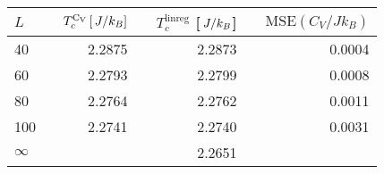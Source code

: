 \begin{tabular}{lrrr}
\toprule
$L$ & $\quad T_c^\mathrm{C_V}\,[\,J/k_B]$ & $\quad T_c^\mathrm{linreg}$ [$\,J/k_B$] & $\quad \mathrm{MSE}(C_V/J k_B)$ \\
\midrule
40 & 2.2875 & 2.2873 & 0.0004 \\
60 & 2.2793 & 2.2799 & 0.0008 \\
80 & 2.2764 & 2.2762 & 0.0011 \\
100 & 2.2741 & 2.2740 & 0.0031 \\
$\infty$ &   & 2.2651 &  \\
\bottomrule
\end{tabular}
